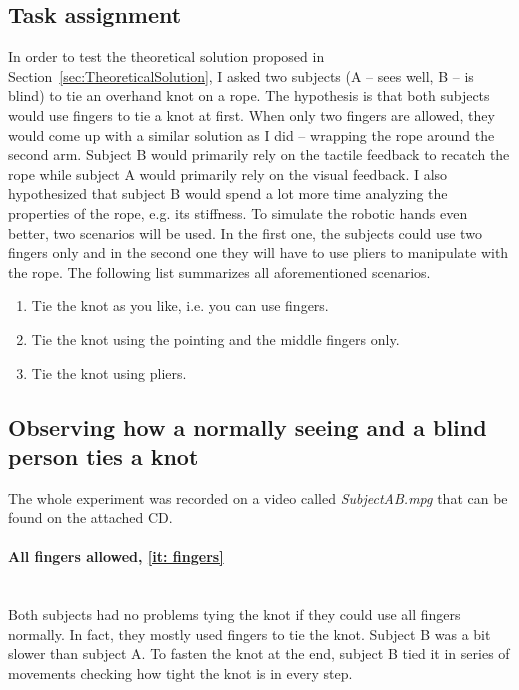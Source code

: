         \subsection{Task assignment}
            In order to test the theoretical solution proposed in Section~\ref{sec:TheoreticalSolution}, I asked two subjects (A -- sees well, B -- is blind) to tie an overhand knot on a rope. The hypothesis is that both subjects would use fingers to tie a knot at first. When only two fingers are allowed, they would come up with a similar solution as I did -- wrapping the rope around the second arm. Subject B would primarily rely on the tactile feedback to recatch the rope while subject A would primarily rely on the visual feedback. I also hypothesized that subject B would spend a lot more time analyzing the properties of the rope, e.g. its stiffness. To simulate the robotic hands even better, two scenarios will be used. In the first one, the subjects could use two fingers only and in the second one they will have to use pliers to manipulate with the rope. The following list summarizes all aforementioned scenarios.
%
            \begin{enumerate}\itemsep0pt
                \item Tie the knot as you like, i.e. you can use fingers. \label{it: fingers}
                \item Tie the knot using the pointing and the middle fingers only. \label{it: 2 fingers only}
                \item Tie the knot using pliers. \label{it: pliers}
            \end{enumerate}

        \subsection{Observing how a normally seeing and a blind person ties a knot}

            The whole experiment was recorded on a video called \textit{SubjectAB.mpg} that can be found on the attached CD.

            \paragraph{All fingers allowed, \ref{it: fingers}}~\\
                \indent Both subjects had no problems tying the knot if they could use all fingers normally. In fact, they mostly used fingers to tie the knot. Subject B was a bit slower than subject A. To fasten the knot at the end, subject B tied it in series of movements checking how tight the knot is in every step.

